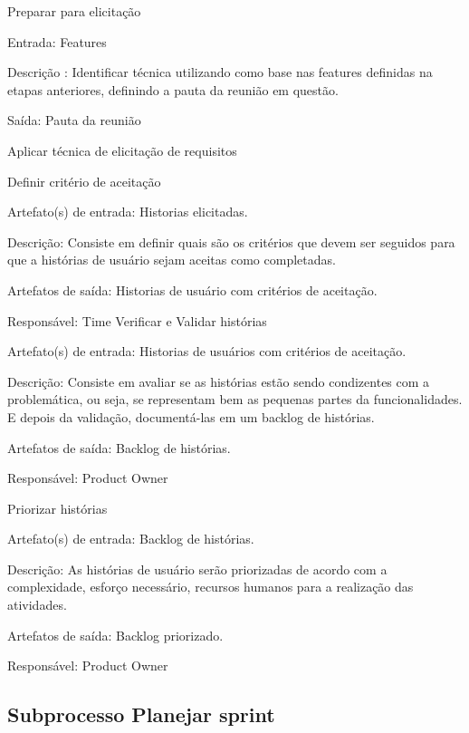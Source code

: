 Preparar para elicitação

Entrada: Features

Descrição : Identificar técnica utilizando como base nas features definidas na etapas anteriores, definindo a pauta da reunião em questão.

Saída: Pauta da reunião

Aplicar técnica de elicitação de requisitos

Definir critério de aceitação

Artefato(s) de entrada: Historias elicitadas.

Descrição: Consiste em definir quais são os critérios que devem ser seguidos para que a histórias de usuário sejam aceitas como completadas.

Artefatos de saída: Historias de usuário com critérios de aceitação.

Responsável: Time
Verificar e Validar histórias

Artefato(s) de entrada: Historias de usuários com critérios de aceitação.

Descrição: Consiste em avaliar se as histórias estão sendo condizentes com a problemática, ou seja, se representam bem as pequenas partes da funcionalidades. E depois da validação, documentá-las em um backlog de histórias.

Artefatos de saída: Backlog de histórias.

Responsável: Product Owner

Priorizar histórias

Artefato(s) de entrada: Backlog de histórias.

Descrição: As histórias de usuário serão priorizadas de acordo com a complexidade, esforço necessário, recursos humanos para a realização das atividades.

Artefatos de saída: Backlog priorizado.

Responsável: Product Owner

\subsection{Subprocesso Planejar sprint}

